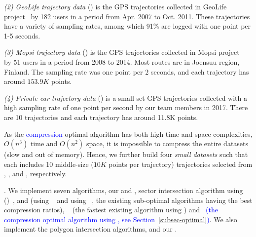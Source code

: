 \vspace{0.5ex}
\ni \emph{(2) GeoLife trajectory data} (\geolife) is the GPS trajectories collected in GeoLife project~\cite{Zheng:GeoLife} by 182 users in a period from Apr. 2007 to Oct. 2011. These trajectories have a variety of sampling rates, among which 91\% are logged with one point per 1-5 seconds. %

\vspace{0.5ex}
\ni \emph{(3) Mopsi trajectory data} (\mopsi) is the GPS trajectories collected in Mopsi project~\cite{Mopsi} by 51 users in a period from 2008 to 2014. Most routes are in Joensuu region, Finland.
The sampling rate was one point per $2$ seconds, and each trajectory has around $153.9K$ points.

\vspace{0.5ex}
\ni \emph{(4) Private car trajectory data} (\pricar) is a small set GPS trajectories collected with a high sampling rate of one point per second by our team members in 2017. There are 10 trajectories and each trajectory has around 11.8K points.


\vspace{0.5ex}
As the \textcolor{blue}{compression} optimal algorithm \osed \cite{Imai:Optimal} has both high time and space complexities, \ie $O(n^3)$ time and $O(n^2)$ space, it is impossible to compress the entire datasets (slow and out of memory). Hence, we further build four \textit{small datasets} such that each includes 10 middle-size ($10K$ points per trajectory) trajectories selected from \sercar, \geolife, \mopsi and \pricar, respectively.


.
We implement seven \lsa algorithms, \ie our \cist and \cista,  sector intersection algorithm using \ped ()~\cite{Dunham:Cone, Zhao:Sleeve},  and \dps (\dpa using \ped~\cite{Douglas:Peucker} and \dpa using \sed~\cite{Meratnia:Spatiotemporal}, the existing sub-optimal \lsa algorithms having the best compression ratios), \squishe~\cite{Muckell:Compression} (the fastest existing \lsa algorithm using \sed) and \osed~\textcolor{blue}{(the compression optimal \lsa algorithm using \sed, see Section~\ref{subsec-optimal})}.
We also implement the polygon intersection algorithms, \cpia and our \rpia.

